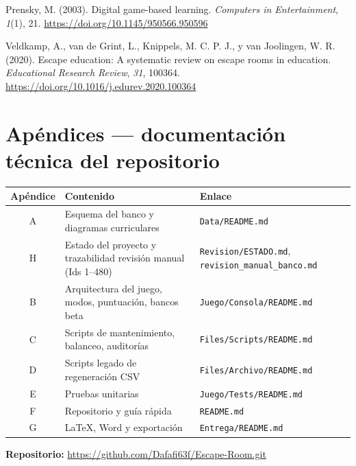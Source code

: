 \documentclass[11pt,a4paper]{article}
\newcommand{\tfgrepo}{\url{https://github.com/Dafafi63f/Escape-Room.git}}
\begin{document}
Prensky, M. (2003). Digital game-based learning. \textit{Computers in Entertainment}, \textit{1}(1), 21. \url{https://doi.org/10.1145/950566.950596}

Veldkamp, A., van de Grint, L., Knippels, M. C. P. J., y van Joolingen, W. R. (2020). Escape education: A systematic review on escape rooms in education. \textit{Educational Research Review}, \textit{31}, 100364. \url{https://doi.org/10.1016/j.edurev.2020.100364}

\section{Apéndices — documentación técnica del repositorio}
\renewcommand{\arraystretch}{1.08}
\begin{tabularx}{\textwidth}{@{}c>{\raggedright\arraybackslash}X>{\raggedright\arraybackslash}p{4.2cm}@{}}
\toprule
\textbf{Apéndice} & \textbf{Contenido} & \textbf{Enlace} \\
\midrule
A & Esquema del banco y diagramas curriculares & \texttt{Data/README.md} \\
H & Estado del proyecto y trazabilidad revisión manual (Ids 1--480) & \texttt{Revision/ESTADO.md}, \texttt{revision\_manual\_banco.md} \\
B & Arquitectura del juego, modos, puntuación, bancos beta & \texttt{Juego/Consola/README.md} \\
C & Scripts de mantenimiento, balanceo, auditorías & \texttt{Files/Scripts/README.md} \\
D & Scripts legado de regeneración CSV & \texttt{Files/Archivo/README.md} \\
E & Pruebas unitarias & \texttt{Juego/Tests/README.md} \\
F & Repositorio y guía rápida & \texttt{README.md} \\
G & LaTeX, Word y exportación & \texttt{Entrega/README.md} \\
\bottomrule
\end{tabularx}

\medskip
\noindent\textbf{Repositorio:} \tfgrepo
\end{document}
